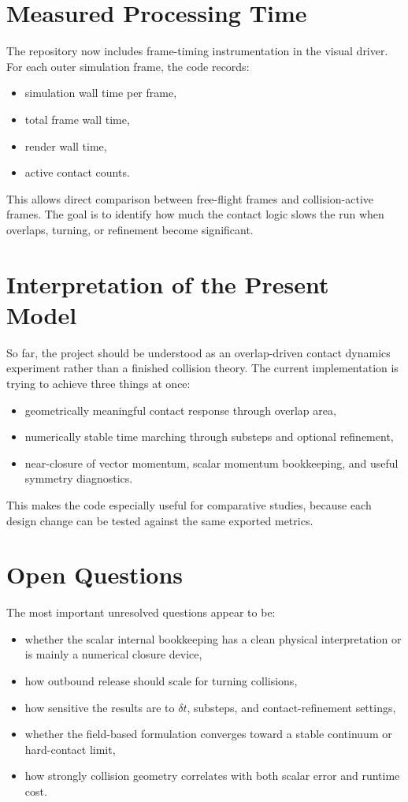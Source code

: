 \documentclass[11pt]{article}
\begin{document}
\section{Measured Processing Time}
The repository now includes frame-timing instrumentation in the visual driver. For each outer simulation frame, the code records:
\begin{itemize}[leftmargin=1.5em]
    \item simulation wall time per frame,
    \item total frame wall time,
    \item render wall time,
    \item active contact counts.
\end{itemize}
This allows direct comparison between free-flight frames and collision-active frames. The goal is to identify how much the contact logic slows the run when overlaps, turning, or refinement become significant.

\section{Interpretation of the Present Model}
So far, the project should be understood as an overlap-driven contact dynamics experiment rather than a finished collision theory. The current implementation is trying to achieve three things at once:
\begin{itemize}[leftmargin=1.5em]
    \item geometrically meaningful contact response through overlap area,
    \item numerically stable time marching through substeps and optional refinement,
    \item near-closure of vector momentum, scalar momentum bookkeeping, and useful symmetry diagnostics.
\end{itemize}

This makes the code especially useful for comparative studies, because each design change can be tested against the same exported metrics.

\section{Open Questions}
The most important unresolved questions appear to be:
\begin{itemize}[leftmargin=1.5em]
    \item whether the scalar internal bookkeeping has a clean physical interpretation or is mainly a numerical closure device,
    \item how outbound release should scale for turning collisions,
    \item how sensitive the results are to $\delta t$, substeps, and contact-refinement settings,
    \item whether the field-based formulation converges toward a stable continuum or hard-contact limit,
    \item how strongly collision geometry correlates with both scalar error and runtime cost.
\end{itemize}
\end{document}
